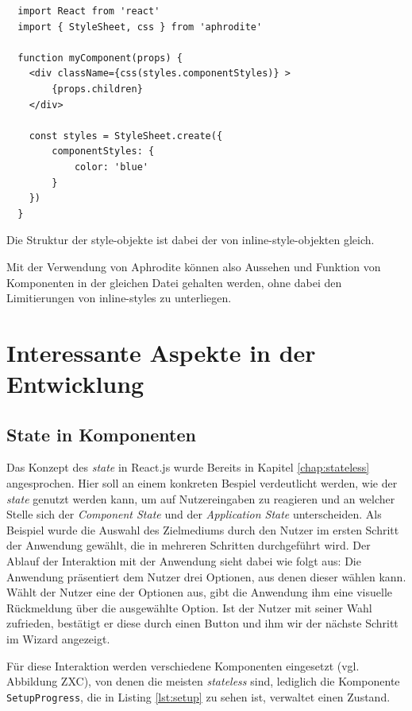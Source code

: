 \begin{lstlisting}
  import React from 'react'
  import { StyleSheet, css } from 'aphrodite'

  function myComponent(props) {
  	<div className={css(styles.componentStyles)} >
  		{props.children}
  	</div>

  	const styles = StyleSheet.create({
  		componentStyles: {
  			color: 'blue'
  		}
  	})
  }
\end{lstlisting}

Die Struktur der style-objekte ist dabei der von inline-style-objekten gleich.

Mit der Verwendung von Aphrodite können also Aussehen und Funktion von Komponenten in der gleichen Datei gehalten werden, ohne dabei den Limitierungen von inline-styles zu unterliegen.


\section{Interessante Aspekte in der Entwicklung}

\subsection{State in Komponenten}
\label{chap:state_component}
Das Konzept des \textit{state} in React.js wurde Bereits in Kapitel \ref{chap:stateless} angesprochen. Hier soll an einem konkreten Bespiel verdeutlicht werden, wie der \textit{state} genutzt werden kann, um auf Nutzereingaben zu reagieren und an welcher Stelle sich der \textit{Component State} und der \textit{Application State} unterscheiden.
Als Beispiel wurde die Auswahl des Zielmediums durch den Nutzer im ersten Schritt der Anwendung gewählt, die in mehreren Schritten durchgeführt wird.
Der Ablauf der Interaktion mit der Anwendung sieht dabei wie folgt aus:
Die Anwendung präsentiert dem Nutzer drei Optionen, aus denen dieser wählen kann. Wählt der Nutzer eine der Optionen aus, gibt die Anwendung ihm eine visuelle Rückmeldung über die ausgewählte Option. Ist der Nutzer mit seiner Wahl zufrieden, bestätigt er diese durch einen Button und  ihm wir der nächste Schritt im Wizard angezeigt.

Für diese Interaktion werden verschiedene Komponenten eingesetzt (vgl. Abbildung ZXC), von denen die meisten \textit{stateless} sind, lediglich die Komponente \verb|SetupProgress|, die in Listing \ref{lst:setup} zu sehen ist\footnotemark{}, verwaltet einen Zustand.


